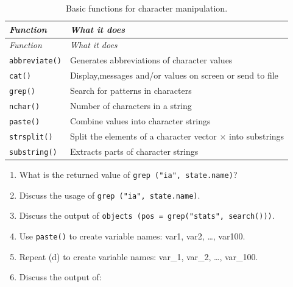 \documentclass[
]{book}
\begin{document}
\begin{longtable}[]{@{}
  >{\raggedright\arraybackslash}p{}
  >{\raggedright\arraybackslash}p{}@{}}
\caption{\label{tab:CharFunc} Basic functions for character manipulation.}\tabularnewline
\toprule\noalign{}
\begin{minipage}[b]{\linewidth}\raggedright
\emph{{Function}}
\end{minipage} & \begin{minipage}[b]{\linewidth}\raggedright
\emph{{What it does}}
\end{minipage} \\
\midrule\noalign{}
\endfirsthead
\toprule\noalign{}
\begin{minipage}[b]{\linewidth}\raggedright
\emph{{Function}}
\end{minipage} & \begin{minipage}[b]{\linewidth}\raggedright
\emph{{What it does}}
\end{minipage} \\
\midrule\noalign{}
\endhead
\bottomrule\noalign{}
\endlastfoot
\texttt{abbreviate()} & Generates abbreviations of character values \\
\texttt{cat()} & Display,messages and/or values on screen or send to file \\
\texttt{grep()} & Search for patterns in characters \\
\texttt{nchar()} & Number of characters in a string \\
\texttt{paste()} & Combine values into character strings \\
\texttt{strsplit()} & Split the elements of a character vector \(\times\) into substrings \\
\texttt{substring()} & Extracts parts of character strings \\
\end{longtable}

\begin{enumerate}
\def\labelenumi{(\alph{enumi})}
\item
  What is the returned value of \texttt{grep\ ("ia",\ state.name)}?
\item
  Discuss the usage of \texttt{grep\ ("ia",\ state.name)}.
\item
  Discuss the output of \texttt{objects\ (pos\ =\ grep("stats",\ search()))}.
\item
  Use \texttt{paste()} to create variable names: var1, var2, \ldots, var100.
\item
  Repeat (d) to create variable names: var\_1, var\_2, \ldots, var\_100.
\item
  Discuss the output of:
\end{enumerate}
\end{document}
